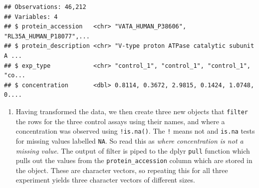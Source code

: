 \documentclass[12pt,]{book}
\newenvironment{Shaded}{\begin{snugshade}}{\end{snugshade}}
\newcommand{\DecValTok}[1]{\textcolor[rgb]{0.00,0.00,0.81}{#1}}
\newcommand{\KeywordTok}[1]{\textcolor[rgb]{0.13,0.29,0.53}{\textbf{#1}}}
\newcommand{\NormalTok}[1]{#1}
\newcommand{\OperatorTok}[1]{\textcolor[rgb]{0.81,0.36,0.00}{\textbf{#1}}}
\newcommand{\StringTok}[1]{\textcolor[rgb]{0.31,0.60,0.02}{#1}}
\providecommand{\tightlist}{%
  \setlength{\itemsep}{0pt}\setlength{\parskip}{0pt}}
\begin{document}
\begin{verbatim}
## Observations: 46,212
## Variables: 4
## $ protein_accession   <chr> "VATA_HUMAN_P38606", "RL35A_HUMAN_P18077",...
## $ protein_description <chr> "V-type proton ATPase catalytic subunit A ...
## $ exp_type            <chr> "control_1", "control_1", "control_1", "co...
## $ concentration       <dbl> 0.8114, 0.3672, 2.9815, 0.1424, 1.0748, 0....
\end{verbatim}

\begin{enumerate}
\def\labelenumi{\arabic{enumi}.}
\setcounter{enumi}{1}
\tightlist
\item
  Having transformed the data, we then create three new objects that
  \texttt{filter} the rows for the three control assays using their names, and where
  a concentration was observed using \texttt{!is.na()}. The \texttt{!} means not and \texttt{is.na} tests
  for missing values labelled \texttt{NA}. So read this as
  \emph{where concentration is not a missing value}. The output of filter is piped to
  the dplyr \texttt{pull} function which pulls out the values from the \texttt{protein\_accession}
  column which are stored in the object. These are character vectors, so repeating
  this for all three experiment yields three character vectors of different sizes.
\end{enumerate}

\begin{Shaded}
\end{Shaded}
\end{document}
